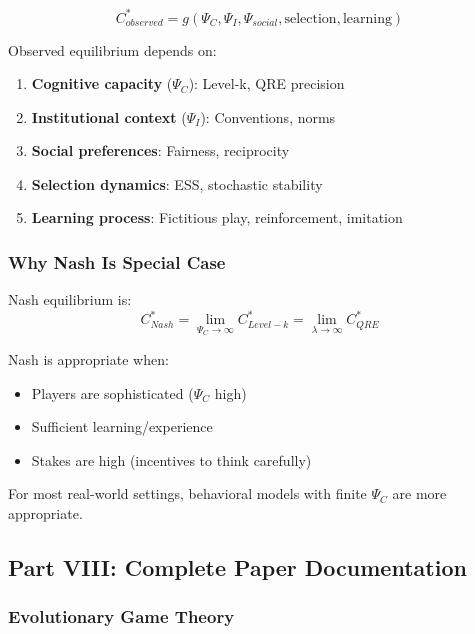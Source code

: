 \begin{equation}
\boxed{
C^*_{observed} = g(\Psi_C, \Psi_I, \Psi_{social}, \text{selection}, \text{learning})
}
\end{equation}

Observed equilibrium depends on:
\begin{enumerate}
    \item \textbf{Cognitive capacity} ($\Psi_C$): Level-k, QRE precision
    \item \textbf{Institutional context} ($\Psi_I$): Conventions, norms
    \item \textbf{Social preferences}: Fairness, reciprocity
    \item \textbf{Selection dynamics}: ESS, stochastic stability
    \item \textbf{Learning process}: Fictitious play, reinforcement, imitation
\end{enumerate}

\subsubsection{Why Nash Is Special Case}

Nash equilibrium is:
\begin{equation}
C^*_{Nash} = \lim_{\Psi_C \to \infty} C^*_{Level-k} = \lim_{\lambda \to \infty} C^*_{QRE}
\end{equation}

Nash is appropriate when:
\begin{itemize}
    \item Players are sophisticated ($\Psi_C$ high)
    \item Sufficient learning/experience
    \item Stakes are high (incentives to think carefully)
\end{itemize}

For most real-world settings, behavioral models with finite $\Psi_C$ are more appropriate.

\subsection{Part VIII: Complete Paper Documentation}

\subsubsection{Evolutionary Game Theory}

